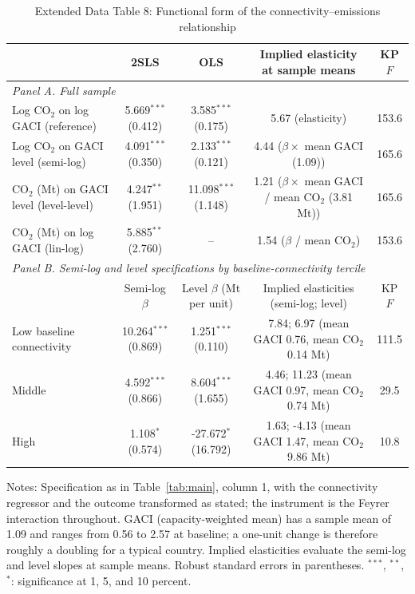 \documentclass[12pt]{article}
\begin{document}
\begin{table}[htbp]
\centering
\begin{threeparttable}
\caption{Extended Data Table 8: Functional form of the connectivity--emissions relationship}
\label{tab:funcform}
\footnotesize
\begin{tabular}{lcccc}
\toprule
 & 2SLS & OLS & Implied elasticity at sample means & KP $F$ \\
\midrule
\multicolumn{5}{l}{\textit{Panel A. Full sample}} \\
  Log CO$_2$ on log GACI (reference) & 5.669$^{***}$ (0.412) & 3.585$^{***}$ (0.175) & 5.67 (elasticity) & 153.6 \\
  Log CO$_2$ on GACI level (semi-log) & 4.091$^{***}$ (0.350) & 2.133$^{***}$ (0.121) & 4.44 ($\beta \times$ mean GACI (1.09)) & 165.6 \\
  CO$_2$ (Mt) on GACI level (level-level) & 4.247$^{**}$ (1.951) & 11.098$^{***}$ (1.148) & 1.21 ($\beta \times$ mean GACI / mean CO$_2$ (3.81 Mt)) & 165.6 \\
  CO$_2$ (Mt) on log GACI (lin-log) & 5.885$^{**}$ (2.760) & -- & 1.54 ($\beta$ / mean CO$_2$) & 153.6 \\
\midrule
\multicolumn{5}{l}{\textit{Panel B. Semi-log and level specifications by baseline-connectivity tercile}} \\
 & Semi-log $\beta$ & Level $\beta$ (Mt per unit) & Implied elasticities (semi-log; level) & KP $F$ \\
  Low baseline connectivity & 10.264$^{***}$ (0.869) & 1.251$^{***}$ (0.110) & 7.84; 6.97 (mean GACI 0.76, mean CO$_2$ 0.14 Mt) & 111.5 \\
  Middle & 4.592$^{***}$ (0.866) & 8.604$^{***}$ (1.655) & 4.46; 11.23 (mean GACI 0.97, mean CO$_2$ 0.74 Mt) & 29.5 \\
  High & 1.108$^{*}$ (0.574) & -27.672$^{*}$ (16.792) & 1.63; -4.13 (mean GACI 1.47, mean CO$_2$ 9.86 Mt) & 10.8 \\
\bottomrule
\end{tabular}
\begin{tablenotes}[flushleft]
\footnotesize
\item Notes: Specification as in Table~\ref{tab:main}, column 1, with the connectivity regressor and the outcome transformed as stated; the instrument is the Feyrer interaction throughout. GACI (capacity-weighted mean) has a sample mean of 1.09 and ranges from 0.56 to 2.57 at baseline; a one-unit change is therefore roughly a doubling for a typical country. Implied elasticities evaluate the semi-log and level slopes at sample means. Robust standard errors in parentheses. $^{***}$, $^{**}$, $^{*}$: significance at 1, 5, and 10 percent.
\end{tablenotes}
\end{threeparttable}
\end{table}
\end{document}
